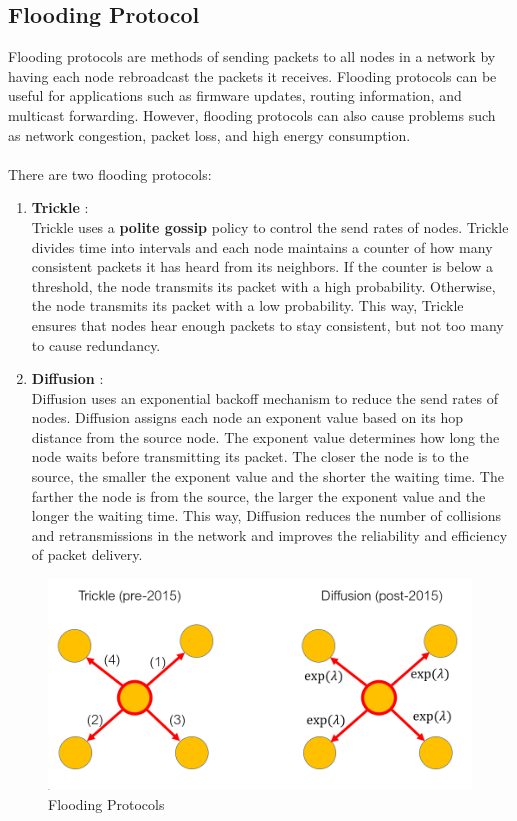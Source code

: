 \subsection{Flooding Protocol}
 Flooding protocols are methods of sending packets to all nodes in a network by having each node rebroadcast the packets it receives. Flooding protocols can be useful for applications such as firmware updates, routing information, and multicast forwarding. However, flooding protocols can also cause problems such as network congestion, packet loss, and high energy consumption.\\\\
 There are two flooding protocols:
 \begin{enumerate}
    \item \textbf{Trickle} : \\
    Trickle uses a \textbf{polite gossip} policy to control the send rates of nodes. Trickle divides time into intervals and each node maintains a counter of how many consistent packets it has heard from its neighbors. If the counter is below a threshold, the node transmits its packet with a high probability. Otherwise, the node transmits its packet with a low probability. This way, Trickle ensures that nodes hear enough packets to stay consistent, but not too many to cause redundancy.
    \item \textbf{Diffusion} : \\
    Diffusion uses an exponential backoff mechanism to reduce the send rates of nodes. Diffusion assigns each node an exponent value based on its hop distance from the source node. The exponent value determines how long the node waits before transmitting its packet. The closer the node is to the source, the smaller the exponent value and the shorter the waiting time. The farther the node is from the source, the larger the exponent value and the longer the waiting time. This way, Diffusion reduces the number of collisions and retransmissions in the network and improves the reliability and efficiency of packet delivery.
 \end{enumerate}
\begin{figure}[h!]
    \centering
    \includegraphics[width=0.6\linewidth]{Fig/04/F10}
    \caption{Flooding Protocols}
    \label{fig:f10}
\end{figure}
